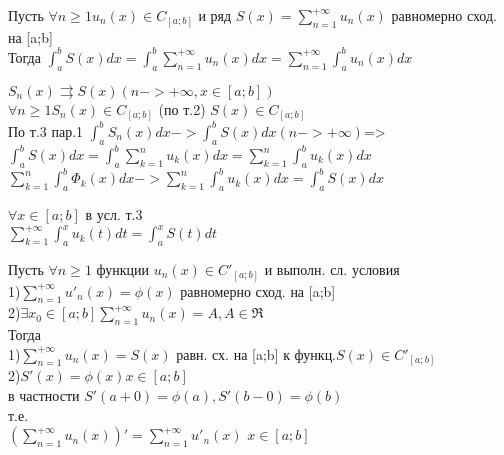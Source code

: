 \begin{Th}
  Пусть $\forall n \geqslant 1 u_n(x)\in C_{[a;b]}$ и ряд  $S(x) = \sum \limits_{n=1}^{+ \infty} u_n(x)$ равномерно сход. на [a;b]\\
  Тогда $\int_{a}^{b} S(x) dx = \int_{a}^{b}\sum \limits_{n=1}^{+ \infty} u_n(x)dx=\sum \limits_{n=1}^{+ \infty}\int_{a}^{b} u_n(x)dx$\\
\end{Th}

\begin{Proof}
  $S_n(x)\rightrightarrows S(x) (n->+\infty, x \in [a;b])$\\
  $\forall n \geqslant 1 S_n(x)\in C_{[a;b]}$ (по т.2) $S(x)\in C_{[a;b]}$\\
  По т.3 пар.1 $\int_{a}^{b} S_n(x) dx ->\int_{a}^{b} S(x) dx (n->+\infty)$=>\\
  $\int_{a}^{b} S(x) dx =\int_{a}^{b}\sum \limits_{k=1}^{n} u_k(x)dx=\sum \limits_{k=1}^{n}\int_{a}^{b} u_k(x)dx$
  $\sum \limits_{k=1}^{n}\int_{a}^{b} \Phi_k(x)dx->\sum \limits_{k=1}^{n}\int_{a}^{b} u_k(x)dx=\int_{a}^{b} S(x) dx$\\
\end{Proof}

\begin{Note}
  $\forall x \in [a;b]$  в усл. т.3\\  
  $\sum \limits_{k=1}^{+\infty}\int_{a}^{x} u_k(t)dt=\int_{a}^{x} S(t)dt$
\end{Note}

\begin{Th}
  Пусть $\forall n \geqslant 1$ функции $u_n(x)\in C'_{[a;b]}$ и выполн. сл. условия\\
  1)$\sum \limits_{n=1}^{+ \infty} u'_n(x)=\phi(x)$ равномерно сход. на [a;b]\\
  2)$\exists x_0 \in [a;b] \sum \limits_{n=1}^{+ \infty} u_n(x)=A, A\in \Re$\\
  Тогда\\
  1)$\sum \limits_{n=1}^{+ \infty} u_n(x)=S(x)$ равн. сх. на [a;b] к функц.$S(x)\in C'_{[a;b]}$\\
  2)$S'(x)=\phi(x) x \in [a;b]$\\
  в частности $S'(a+0)=\phi(a), S'(b-0)=\phi(b)$\\
  т.е.\\
  $(\sum \limits_{n=1}^{+ \infty} u_n(x))'=\sum \limits_{n=1}^{+ \infty} u'_n(x)$ $x\in [a;b]$\\
\end{Th}

